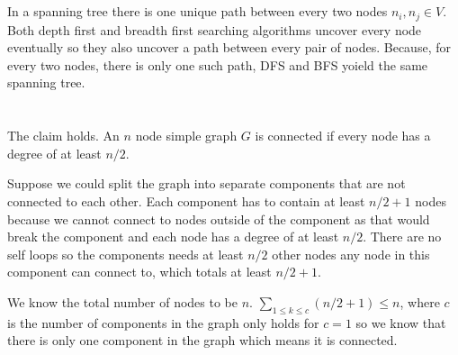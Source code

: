 \documentclass[12pt, a4paper]{article}
\begin{document}
\section{} %
In a spanning tree there is one unique path between every two nodes $n_i, n_j \in V$. Both depth first and breadth first searching algorithms uncover every node eventually so they also uncover a path between every pair of nodes. Because, for every two nodes, there is only one such path, DFS and BFS yoield the same spanning tree.

\section{} %
The claim holds. An $n$ node simple graph $G$ is connected if every node has a degree of at least $n/2$.

Suppose we could split the graph into separate components that are not connected to each other. Each component has to contain at least $n/2 + 1$ nodes because we cannot connect to nodes outside of the component as that would break the component and each node has a degree of at least $n/2$. There are no self loops so the components needs at least $n/2$ other nodes any node in this component can connect to, which totals at least $n/2 + 1$.

We know the total number of nodes to be $n$. $\sum_{1 \leq k \leq c} (n/2 + 1) \leq n$, where $c$ is the number of components in the graph only holds for $c = 1$ so we know that there is only one component in the graph which means it is connected.
\end{document}
